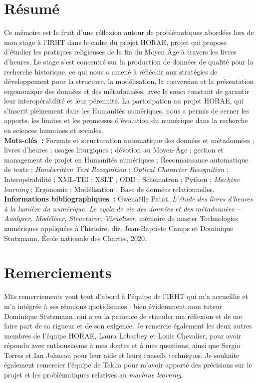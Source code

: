 \documentclass[a4paper,12pt,twoside]{book}
\begin{document}
	\chapter*{Résumé}
	\medskip
	Ce mémoire est le fruit d'une réflexion autour de problématiques abordées lors de mon stage à l'IRHT dans le cadre du projet HORAE, projet qui propose d'étudier les pratiques religieuses de la fin du Moyen Âge à travers les livres d'heures. Le stage s'est concentré sur la production de données de qualité pour la recherche historique, ce qui nous a amené à réfléchir aux stratégies de développement pour la structure, la modélisation, la conversion et la présentation ergonomique des données et des métadonnées, avec le souci constant de garantir leur interopérabilité et leur pérennité. La participation au projet HORAE, qui s'inscrit pleinement dans les Humanités numériques, nous a permis de cerner les apports, les limites et les promesses d'évolution du numérique dans la recherche en sciences humaines et sociales.\\
	
	\textbf{Mots-clés~:} Formats et structuration automatique des données et métadonnées ; livres d'heures ; usages liturgiques ; dévotion au Moyen-Âge ; gestion et management de projet en Humanités numériques ; Reconnaissance automatique de texte ; \textit{Handwritten Text Recognition} ; \textit{Optical Character Recognition} ; Interopérabilité ; XML-TEI ; XSLT ; ODD ; Schematron ; Python ; \textit{Machine learning} ; Ergonomie ; Modélisation ; Base de données relationnelles.\\
	
	\textbf{Informations bibliographiques~:} Gwenaëlle Patat, \textit{L’étude des livres d’heures à la lumière du numérique. Le cycle de vie des données et des métadonnées – Analyser, Modéliser, Structurer, Visualiser}, mémoire de master \og{}Technologies numériques appliquées à l'histoire\fg{}, dir. Jean-Baptiste Camps et Dominique Stutzmann, École nationale des Chartes, 2020.
	
	\chapter*{Remerciements}
	
	\lettrine{M}es remerciements vont tout d'abord à l'équipe de l'IRHT qui m'a accueillie et m'a intégrée à ses réunions quotidiennes : bien évidemment mon tuteur Dominique Stutzmann, qui a eu la patience de stimuler ma réflexion et de me faire part de sa rigueur et de son exigence. Je remercie également les deux autres membres de l'équipe HORAE, Laura Lebarbey et Louis Chevalier, pour avoir répondu avec enthousiasme à mes doutes et à mes questions, ainsi que Sergio Torres et Ian Johnson pour leur aide et leurs conseils techniques. Je souhaite également remercier l'équipe de Teklia pour m'avoir apporté des précisions sur le projet et les problématiques relatives au \textit{machine learning}.\\
	
\end{document}
